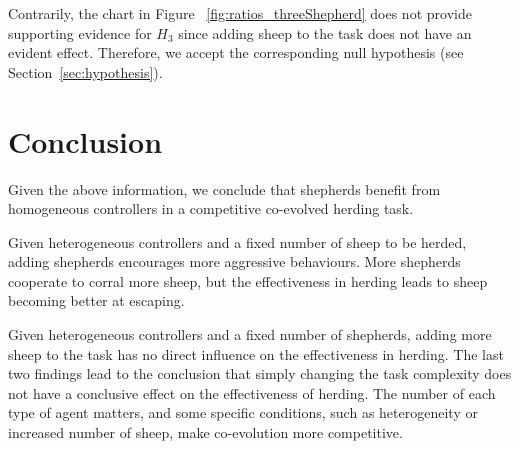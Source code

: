 \documentclass[conference]{IEEEtran}
\begin{document}

Contrarily, the chart in Figure ~\ref{fig:ratios_threeShepherd} does not provide supporting evidence for $H_3$ since adding sheep to the task does not have an evident effect. Therefore, we accept the corresponding null hypothesis (see Section~\ref{sec:hypothesis}). 

\section{Conclusion}
\label{sec:conclusion}
Given the above information, we conclude that shepherds benefit from homogeneous controllers in a competitive co-evolved herding task. 

Given heterogeneous controllers and a fixed number of sheep to be herded, adding shepherds encourages more aggressive behaviours. More shepherds cooperate to corral more sheep, but the effectiveness in herding leads to sheep becoming better at escaping. 

Given heterogeneous controllers and a fixed number of shepherds, adding more sheep to the task has no direct influence on the effectiveness in herding.
The last two findings lead to the conclusion that simply changing the task complexity does not have a conclusive effect on the effectiveness of herding. The number of each type of agent matters, and some specific conditions, such as heterogeneity or increased number of sheep, make co-evolution more competitive.

\newpage
\printbibliography
\end{document}
